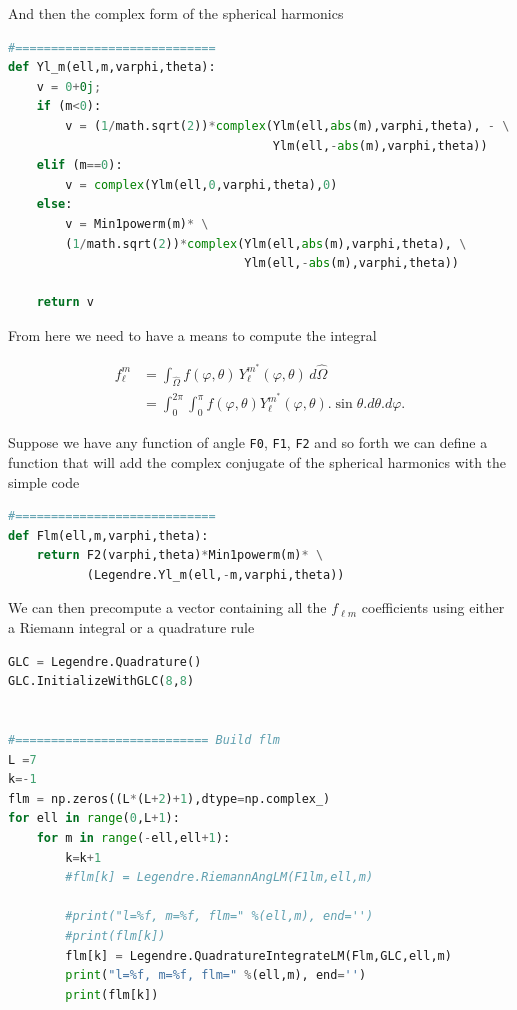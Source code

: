 \documentclass[11pt,letterpaper,titlepage]{article}
\numberwithin{equation}{section}
\begin{document}
And then the complex form of the spherical harmonics
\begin{lstlisting}[language=python]
#============================
def Yl_m(ell,m,varphi,theta):
    v = 0+0j;
    if (m<0):
        v = (1/math.sqrt(2))*complex(Ylm(ell,abs(m),varphi,theta), - \
                                     Ylm(ell,-abs(m),varphi,theta))
    elif (m==0):
        v = complex(Ylm(ell,0,varphi,theta),0)
    else:
        v = Min1powerm(m)* \
        (1/math.sqrt(2))*complex(Ylm(ell,abs(m),varphi,theta), \
                                 Ylm(ell,-abs(m),varphi,theta))
        
    return v
\end{lstlisting}

\newpage
From here we need to have a means to compute the integral

\begin{equation*}
\begin{aligned}
f_{\ell }^m
&=\int _{\hat{\Omega} }f(\varphi,\theta )\,Y_{\ell }^{m^*}(\varphi,\theta)\,d\hat{\Omega} \\
&=\int _{0}^{2\pi }\int _{0}^{\pi } f(\varphi,\theta )Y_{\ell }^{m^*}(\varphi,\theta ) .\sin \theta .d\theta .d\varphi .
\end{aligned}
\end{equation*}

Suppose we have any function of angle \texttt{F0}, \texttt{F1}, \texttt{F2} and so forth we can define a function that will add the complex conjugate of the spherical harmonics with the simple code

\begin{lstlisting}[language=python]
#============================
def Flm(ell,m,varphi,theta):
    return F2(varphi,theta)*Min1powerm(m)* \
           (Legendre.Yl_m(ell,-m,varphi,theta))
\end{lstlisting}

We can then precompute a vector containing all the $f_{\ell m}$ coefficients using either a Riemann integral or a quadrature rule

\begin{lstlisting}[language=python]
GLC = Legendre.Quadrature()
GLC.InitializeWithGLC(8,8)


#=========================== Build flm
L =7
k=-1
flm = np.zeros((L*(L+2)+1),dtype=np.complex_)
for ell in range(0,L+1):
    for m in range(-ell,ell+1):
        k=k+1
        #flm[k] = Legendre.RiemannAngLM(F1lm,ell,m)
        
        #print("l=%f, m=%f, flm=" %(ell,m), end='')
        #print(flm[k])
        flm[k] = Legendre.QuadratureIntegrateLM(Flm,GLC,ell,m)
        print("l=%f, m=%f, flm=" %(ell,m), end='')
        print(flm[k])
\end{lstlisting}
\end{document}
